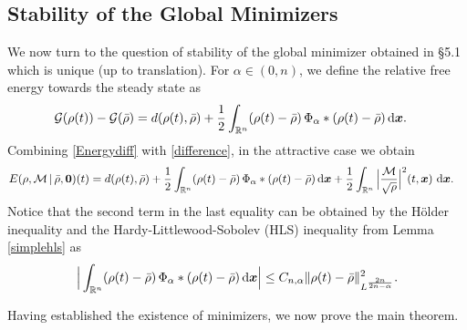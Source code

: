 \documentclass[reqno,11pt]{amsart}
\numberwithin{equation}{section}
\theoremstyle{definition}
\def\dd{{\, \rm d}}
\begin{document}
\subsection{Stability of the Global Minimizers}
We now turn to the question of stability of the global minimizer obtained in \S 5.1
which is unique (up to translation). 
For $\alpha \in (0,n)$, we define the relative free energy towards the steady state as
\begin{align}\label{difference}
    \begin{split}
 \mathcal{G}(\rho(t)) - \mathcal{G}(\bar{\rho}) & = d(\rho(t),\bar{\rho}) + \frac{1}{2} \int_{\mathbb{R}^n} (\rho(t) - \bar{\rho})\, \Phi_\alpha* (\rho(t) - \bar{\rho}) \dd \boldsymbol{x}.
    \end{split}
\end{align}
Combining \eqref{Energydiff} with \eqref{difference}, in the attractive case we obtain
\begin{align}\label{relative}
 \begin{split}
 E(\rho,\mathcal{M}\, | \, \bar{\rho}, \boldsymbol{0})(t)
& = d(\rho(t),\bar{\rho}) + \frac{1}{2} \int_{\mathbb{R}^n} (\rho(t) - \bar{\rho})\, \Phi_\alpha* (\rho(t) - \bar{\rho}) \dd \boldsymbol{x}
+ \frac{1}{2}\int_{\mathbb{R}^n}
 \Big|\frac{\mathcal{M}}{\sqrt{\rho}}\Big|^2(t,\boldsymbol{x})\,\dd\boldsymbol{x}.
    \end{split}
\end{align}
Notice that the second term in the last equality can be obtained by the H\"older inequality 
and the Hardy-Littlewood-Sobolev (HLS) inequality from Lemma \ref{simplehls} as
\[
\Big|\int_{\mathbb{R}^n} (\rho(t) - \bar{\rho}) \,\Phi_\alpha* (\rho(t) - \bar{\rho}) \dd \boldsymbol{x}\Big| \leq C_{n,\alpha} \| \rho(t) - \bar{\rho} \|_{L^\frac{2n}{2n - \alpha}}^2.
\]

Having established the existence of minimizers, we now prove the main theorem.
\end{document}
